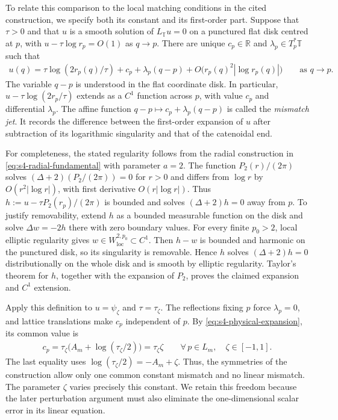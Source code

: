 \documentclass[a4paper,11pt,oneside,reqno]{amsart}
\numberwithin{equation}{section}
\theoremstyle{definition}
\begin{document}
To relate this comparison to the local matching conditions
in the cited construction, we specify both its constant
and its first-order part. Suppose that $\tau>0$ and that
$u$ is a smooth solution of $L_{\mathbb T}u=0$ on a
punctured flat disk centred at $p$, with
$u-\tau\log r_p=O(1)$ as $q\to p$. There are unique
$c_p\in\mathbb R$ and $\lambda_p\in T_p^*\mathbb T$
such that
%
\begin{align*}
    u(q)=\tau\log(2r_p(q)/\tau)
        +c_p+\lambda_p(q-p)
        +O\bigl(r_p(q)^2|\log r_p(q)|\bigr)
        \qquad\text{as }q\to p.
\end{align*}
%
The variable $q-p$ is understood in the flat coordinate
disk. In particular, $u-\tau\log(2r_p/\tau)$ extends as
a $C^1$ function across $p$, with value $c_p$ and
differential $\lambda_p$. The affine function
$q-p\mapsto c_p+\lambda_p(q-p)$ is called the
\textit{mismatch jet}. It records the difference between
the first-order expansion of $u$ after subtraction of
its logarithmic singularity and that of the catenoidal
end.

For completeness, the stated regularity follows from the
radial construction in \eqref{eq:s4-radial-fundamental}
with parameter $a=2$. The function
$P_2(r)/(2\pi)$ solves $(\Delta+2)(P_2/(2\pi))=0$
    for $r>0$
and differs from $\log r$ by $O(r^2|\log r|)$, with
first derivative $O(r|\log r|)$. Thus
$h:=u-\tau P_2(r_p)/(2\pi)$ is bounded and solves
$(\Delta+2)h=0$ away from $p$.
To justify removability, extend $h$ as a bounded
measurable function on the disk and solve
$\Delta w=-2h$ there with zero boundary values.
For every finite $p_0>2$, local elliptic regularity gives
$w\in W^{2,p_0}_{\mathrm{loc}}\subset C^1$.
Then $h-w$ is bounded and harmonic on the punctured
disk, so its singularity is removable. Hence $h$ solves
$(\Delta+2)h=0$ distributionally on the whole disk and
is smooth by elliptic regularity. Taylor's theorem for
$h$, together with the expansion of $P_2$, proves the
claimed expansion and $C^1$ extension.

Apply this definition to $u=\psi_\zeta$ and
$\tau=\tau_\zeta$. The reflections fixing $p$ force
$\lambda_p=0$, and lattice translations make $c_p$
independent of $p$. By \eqref{eq:s4-physical-expansion},
its common value is
%
\begin{align}
    \label{eq:s4-exact-mismatch}
    c_p
    =\tau_\zeta\bigl(A_m+\log(\tau_\zeta/2)\bigr)
    =\tau_\zeta\zeta
    \qquad\forall\,p\in L_m,\quad\zeta\in[-1,1].
\end{align}
%
The last equality uses
$\log(\tau_\zeta/2)=-A_m+\zeta$.
Thus, the symmetries of the construction allow only one common constant
mismatch and no linear mismatch. The parameter $\zeta$
varies precisely this constant. We retain this freedom
because the later perturbation argument must also
eliminate the one-dimensional scalar error in its
linear equation.
\end{document}
